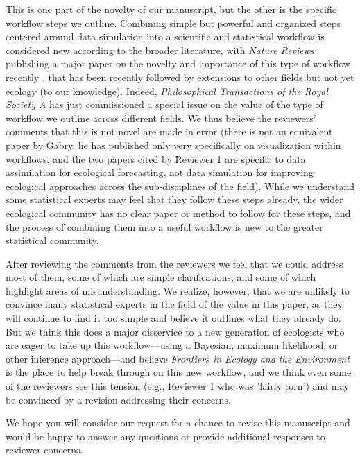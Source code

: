 \documentclass[11pt]{article}
\begin{document}
This is one part of the novelty of our manuscript, but the other is the specific workflow steps we outline. Combining simple but powerful and organized steps centered around data simulation into a scientific and statistical workflow is considered new according to the broader literature, with \emph{Nature Reviews} publishing a major paper on the novelty and importance of this type of workflow recently \citep[this may be the Gelman publication Reviewer 3 mentions,][]{vandeschoot2021}, that has been recently followed by extensions to other fields \citep[for example in medicine, veterinary and cognitive sciences,][]{grinsztajn2021,schad2021,mielke2023workflow,hess2024bayesian} but not yet ecology (to our knowledge). Indeed, \emph{Philosophical Transactions of the Royal Society A} has just commissioned a special issue on the value of the type of workflow we outline across different fields. We thus believe the reviewers' comments that this is not novel are made in error (there is not an equivalent paper by Gabry, he has published only very specifically on visualization within workflows, and the two papers cited by Reviewer 1 are specific to data assimilation for ecological forecasting, not data simulation for improving ecological approaches across the sub-disciplines of the field). While we understand some statistical experts may feel that they follow these steps already, the wider ecological community has no clear paper or method to follow for these steps, and the process of combining them into a useful workflow is new to the greater statistical community. 

After reviewing the comments from the reviewers we feel that we could address most of them, some of which are simple clarifications, and some of which highlight areas of misunderstanding. We realize, however, that we are unlikely to convince many statistical experts in the field of the value in this paper, as they will continue to find it too simple and believe it outlines what they already do. But we think this does a major disservice to a new generation of ecologists who are eager to take up this workflow---using a Bayesian, maximum likelihood, or other inference approach---and believe \emph{Frontiers in Ecology and the Environment} is the place to help break through on this new workflow, and we think even some of the reviewers see this tension (e.g., Reviewer 1 who was 'fairly torn') and may be convinced by a revision addressing their concerns. 

We hope you will consider our request for a chance to revise this manuscript and would be happy to answer any questions or provide additional responses to reviewer concerns. 
\end{document}
